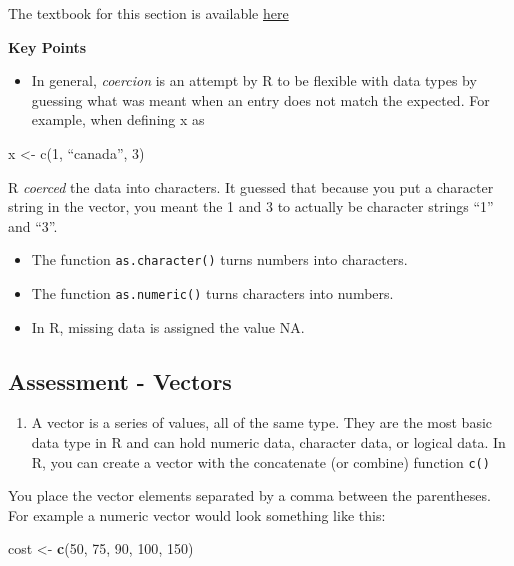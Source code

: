 \documentclass[
]{article}
\newenvironment{Shaded}{\begin{snugshade}}{\end{snugshade}}
\newcommand{\DecValTok}[1]{\textcolor[rgb]{0.00,0.00,0.81}{#1}}
\newcommand{\KeywordTok}[1]{\textcolor[rgb]{0.13,0.29,0.53}{\textbf{#1}}}
\newcommand{\NormalTok}[1]{#1}
\newcommand{\StringTok}[1]{\textcolor[rgb]{0.31,0.60,0.02}{#1}}
\providecommand{\tightlist}{%
  \setlength{\itemsep}{0pt}\setlength{\parskip}{0pt}}
\begin{document}
The textbook for this section is available
\href{https://rafalab.github.io/dsbook/r-basics.html\#coercion}{here}

\textbf{Key Points}

\begin{itemize}
\tightlist
\item
  In general, \emph{coercion} is an attempt by R to be flexible with
  data types by guessing what was meant when an entry does not match the
  expected. For example, when defining x as
\end{itemize}

x \textless- c(1, ``canada'', 3)

R \emph{coerced} the data into characters. It guessed that because you
put a character string in the vector, you meant the 1 and 3 to actually
be character strings ``1'' and ``3''.

\begin{itemize}
\tightlist
\item
  The function \texttt{as.character()} turns numbers into characters.
\item
  The function \texttt{as.numeric()} turns characters into numbers.
\item
  In R, missing data is assigned the value NA.
\end{itemize}

\hypertarget{assessment---vectors}{%
\subsection{Assessment - Vectors}\label{assessment---vectors}}

\begin{enumerate}
\def\labelenumi{\arabic{enumi}.}
\tightlist
\item
  A vector is a series of values, all of the same type. They are the
  most basic data type in R and can hold numeric data, character data,
  or logical data. In R, you can create a vector with the concatenate
  (or combine) function \texttt{c()}
\end{enumerate}

You place the vector elements separated by a comma between the
parentheses. For example a numeric vector would look something like
this:

\begin{Shaded}
\begin{Highlighting}[]
\NormalTok{cost <-}\StringTok{ }\KeywordTok{c}\NormalTok{(}\DecValTok{50}\NormalTok{, }\DecValTok{75}\NormalTok{, }\DecValTok{90}\NormalTok{, }\DecValTok{100}\NormalTok{, }\DecValTok{150}\NormalTok{)}
\end{Highlighting}
\end{Shaded}
\end{document}
